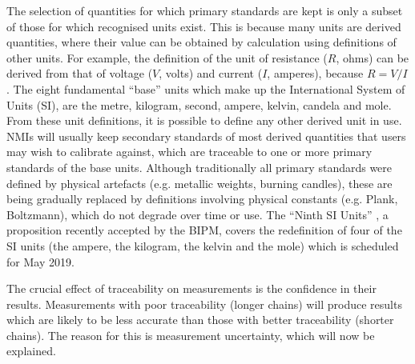 \documentclass[../thesis/thesis.tex]{subfiles}
\begin{document}
\begin{refsection}
The selection of quantities for which primary standards are kept is only a subset of those for which recognised units exist. This is because many units are derived quantities, where their value can be obtained by calculation using definitions of other units. For example, the definition of the unit of resistance ($R$, ohms) can be derived from that of voltage ($V$, volts) and current ($I$, amperes), because $R=V/I$. The eight fundamental ``base'' units which make up the International System of Units (SI), are the metre, kilogram, second, ampere, kelvin, candela and mole. From these unit definitions, it is possible to define any other derived unit in use. NMIs will usually keep secondary standards of most derived quantities that users may wish to calibrate against, which are traceable to one or more primary standards of the base units. Although traditionally all primary standards were defined by physical artefacts (e.g. metallic weights, burning candles), these are being gradually replaced by definitions involving physical constants (e.g. Plank, Boltzmann), which do not degrade over time or use. The ``Ninth SI Units'' \cite{SI}, a proposition recently accepted by the BIPM, covers the redefinition of four of the SI units (the ampere, the kilogram, the kelvin and the mole) which is scheduled for May 2019.

The crucial effect of traceability on measurements is the confidence in their results. Measurements with poor traceability (longer chains) will produce results which are likely to be less accurate than those with better traceability (shorter chains). The reason for this is measurement uncertainty, which will now be explained.


\end{refsection}
\end{document}
